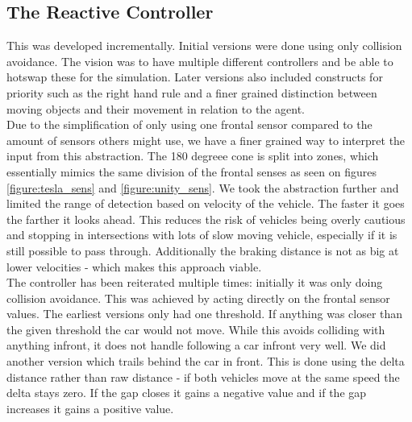 \subsection{The Reactive Controller}
This was developed incrementally. Initial versions were done using only collision avoidance.
The vision was to have multiple different controllers and be able to hotswap these for the simulation.
Later versions also included constructs for priority such as the right hand rule and a finer grained distinction between moving objects and their movement in relation to the agent.\\

Due to the simplification of only using one frontal sensor compared to the amount of sensors others might use, we have a finer grained way to interpret the input from this abstraction.
The 180 degreee cone is split into zones, which essentially mimics the same division of the frontal senses as seen on figures \ref{figure:tesla_sens} and \ref{figure:unity_sens}.
We took the abstraction further and limited the range of detection based on velocity of the vehicle. The faster it goes the farther it looks ahead.
This reduces the risk of vehicles being overly cautious and stopping in intersections with lots of slow moving vehicle, especially if it is still possible to pass through.
Additionally the braking distance is not as big at lower velocities - which makes this approach viable.\\

The controller has been reiterated multiple times: initially it was only doing collision avoidance.
This was achieved by acting directly on the frontal sensor values.
The earliest versions only had one threshold. If anything was closer than the given threshold the car would not move.
While this avoids colliding with anything infront, it does not handle following a car infront very well.
We did another version which trails behind the car in front.
This is done using the delta distance rather than raw distance - if both vehicles move at the same speed the delta stays zero.
If the gap closes it gains a negative value and if the gap increases it gains a positive value.
